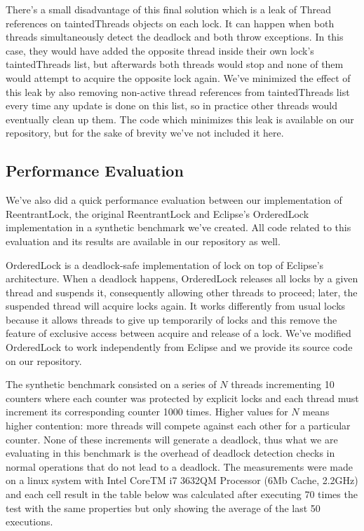 There's a small disadvantage of this final solution which is a leak of Thread references on taintedThreads objects on each lock. It can happen when both threads
simultaneously detect the deadlock and both throw exceptions. In this case, they would have added the opposite thread inside their own lock's taintedThreads list, but afterwards
both threads would stop and none of them would attempt to acquire the opposite lock again. We've minimized the effect of this leak by also removing non-active thread
references from taintedThreads list every time any update is done on this list, so in practice other threads would eventually clean up them. The code which minimizes this
leak is available on our repository, but for the sake of brevity we've not included it here.


\subsection{Performance Evaluation}

We've also did a quick performance evaluation between our implementation of ReentrantLock, the original ReentrantLock and Eclipse's OrderedLock implementation \cite{orderedlock}
in a synthetic benchmark we've created. All code related to this evaluation and its results are available in our repository as well.

OrderedLock is a deadlock-safe implementation of lock on top of Eclipse's architecture. When a deadlock happens, OrderedLock releases all locks by a given thread and suspends it, consequently allowing other threads to proceed; later, the suspended thread will acquire locks again. It works differently from usual locks because it allows threads to give up
temporarily of locks and this remove the feature of exclusive access between acquire and release of a lock. We've modified OrderedLock to work independently from Eclipse and we
provide its source code on our repository.

The synthetic benchmark consisted on a series of $N$ threads incrementing 10 counters where each counter was protected by explicit locks and each thread must increment its corresponding counter 1000 times. Higher values for $N$ means higher contention: more threads will compete against each other for a particular counter. None of these increments will generate a deadlock, thus what we are evaluating in this benchmark is the overhead of deadlock detection checks in normal operations that do not lead to a deadlock. The measurements were made on a linux system with Intel\textsuperscript{\textregistered} CoreTM i7­ 3632QM Processor (6Mb Cache, 2.2GHz) and each cell result in the table below was calculated after executing 70 times the test with the same properties but only showing the average of the last 50 executions.

